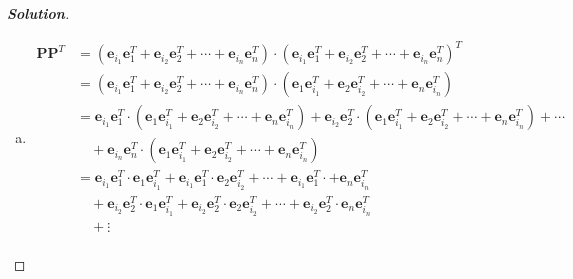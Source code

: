 \documentclass[11pt]{article}
\renewcommand{\vec}[1]{\mathbf{#1}}
\newenvironment{solution}{%
  \begin{proof}[\textbf{Solution}]$ $\par\nobreak\ignorespaces
}{%
  \end{proof}
}
\theoremstyle{definition}
\begin{document}
\begin{solution}
\begin{enumerate}[(a)]
\begin{align*}
            + \begin{bmatrix*}
            0 & 0 & 0 & 1 \\
            0 & 0 & 0 & 0 \\
            0 & 0 & 0 & 0 \\
            0 & 0 & 0 & 0 \\
            \end{bmatrix*} \\
        &= \begin{bmatrix*}
            0 & 0 & 0 & 1 \\
            0 & 1 & 0 & 0 \\
            1 & 0 & 0 & 0 \\
            0 & 0 & 1 & 0 \\
            \end{bmatrix*}
    \end{align*}
    \item \begin{align*}
        \vec{P}\vec{P}^{T} &= (\vec{e}_{i_1}\vec{e}_{1}^T + \vec{e}_{i_2}\vec{e}_{2}^T + \cdots + \vec{e}_{i_n}\vec{e}_{n}^T) \cdot (\vec{e}_{i_1}\vec{e}_{1}^T + \vec{e}_{i_2}\vec{e}_{2}^T + \cdots + \vec{e}_{i_n}\vec{e}_{n}^T)^{T} \\
        &= (\vec{e}_{i_1}\vec{e}_{1}^T + \vec{e}_{i_2}\vec{e}_{2}^T + \cdots + \vec{e}_{i_n}\vec{e}_{n}^T) \cdot (\vec{e}_{1}\vec{e}_{i_1}^T + \vec{e}_{2}\vec{e}_{i_2}^T + \cdots + \vec{e}_{n}\vec{e}_{i_n}^T) \\
        &= \vec{e}_{i_1}\vec{e}_{1}^T \cdot (\vec{e}_{1}\vec{e}_{i_1}^T + \vec{e}_{2}\vec{e}_{i_2}^T + \cdots + \vec{e}_{n}\vec{e}_{i_n}^T) + \vec{e}_{i_2}\vec{e}_{2}^T \cdot (\vec{e}_{1}\vec{e}_{i_1}^T + \vec{e}_{2}\vec{e}_{i_2}^T + \cdots + \vec{e}_{n}\vec{e}_{i_n}^T) + \cdots \\
        &\quad + \vec{e}_{i_n}\vec{e}_{n}^T \cdot (\vec{e}_{1}\vec{e}_{i_1}^T + \vec{e}_{2}\vec{e}_{i_2}^T + \cdots + \vec{e}_{n}\vec{e}_{i_n}^T) \\    
        &= \vec{e}_{i_1}\vec{e}_{1}^T \cdot \vec{e}_{1}\vec{e}_{i_1}^T + \vec{e}_{i_1}\vec{e}_{1}^T \cdot \vec{e}_{2}\vec{e}_{i_2}^T + \cdots + \vec{e}_{i_1}\vec{e}_{1}^T \cdot + \vec{e}_{n}\vec{e}_{i_n}^T \\
        &\quad + \vec{e}_{i_2}\vec{e}_{2}^T \cdot \vec{e}_{1}\vec{e}_{i_1}^T + \vec{e}_{i_2}\vec{e}_{2}^T \cdot \vec{e}_{2}\vec{e}_{i_2}^T + \cdots + \vec{e}_{i_2}\vec{e}_{2}^T \cdot \vec{e}_{n}\vec{e}_{i_n}^T \\
        &\quad + \vdots \\

\end{align*}
\end{enumerate}
\end{solution}
\end{document}
